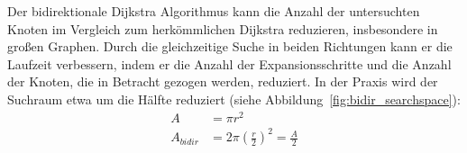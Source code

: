 Der bidirektionale Dijkstra Algorithmus kann die Anzahl der untersuchten Knoten im Vergleich zum
herkömmlichen Dijkstra reduzieren, insbesondere in großen Graphen. Durch die gleichzeitige Suche in
beiden Richtungen kann er die Laufzeit verbessern, indem er die Anzahl der Expansionsschritte und
die Anzahl der Knoten, die in Betracht gezogen werden, reduziert. In der Praxis wird der Suchraum
etwa um die Hälfte reduziert (siehe Abbildung~\ref{fig:bidir_searchspace}): %
\begin{align*}
    A         & = \pi r^2                               \\
    A_{bidir} & = 2 \pi (\frac{r}{2})^{2} = \frac{A}{2}
\end{align*}
\begin{figure}[H]
    \centering
    \begin{tikzpicture}[x=0.75pt,y=0.75pt,yscale=-1,xscale=1]


\end{tikzpicture}
\end{figure}
